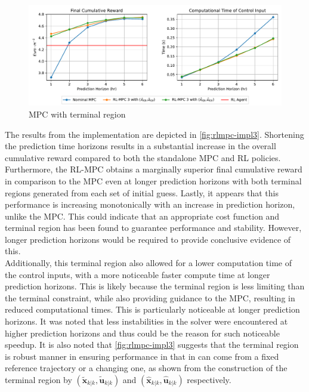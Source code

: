 \begin{figure}[H]
	\centering
	\includegraphics[width=\textwidth]{figures/rl_mpc_impl_3.pdf}
	\caption{MPC with terminal region}
	\label{fig:rlmpc-impl3}
\end{figure}

The results from the implementation are depicted in \autoref{fig:rlmpc-impl3}. Shortening the prediction time horizons results in a substantial increase in the overall cumulative reward compared to both the standalone MPC and RL policies. Furthermore, the RL-MPC obtains a marginally superior final cumulative reward in comparison to the MPC even at longer prediction horizons with both terminal regions generated from each set of initial guess. Lastly, it appears that this performance is increasing monotonically with an increase in prediction horizon, unlike the MPC. This could indicate that an appropriate cost function and terminal region has been found to  guarantee performance and stability. However, longer prediction horizons would be required to provide conclusive evidence of this.\\

Additionally, this terminal region also allowed for a lower computation time of the control inputs, with a more noticeable faster compute time at longer prediction horizons. This is likely because the terminal region is less limiting than the terminal constraint,  while also providing guidance to the MPC, resulting in reduced computational times. This is particularly noticeable at longer prediction horizons. It was noted that less instabilities in the solver were encountered at higher prediction horizons and thus could be the reason for such noticeable speedup. It is also noted that \autoref{fig:rlmpc-impl3} suggests that the terminal region is robust manner in ensuring performance in that in can come from a fixed reference trajectory or a changing one, as shown from the construction of the terminal region by $(\tilde{\mathbf{x}}_{k|k}, \tilde{\mathbf{u}}_{k|k})$ and $(\hat{\mathbf{x}}_{k|k}, \hat{\mathbf{u}}_{k|k})$ respectively. 


